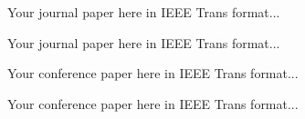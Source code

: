 

\begin{publications}
\newcommand{\JourConfTitle}[1]{\ul{\emph{#1}}}



\begin{journals}

\item Your journal paper here in IEEE Trans format...

\item Your journal paper here in IEEE Trans format...



\end{journals}


\begin{conferences}
\item Your conference paper here in IEEE Trans format...

\item Your conference paper here in IEEE Trans format...



\end{conferences}
\end{publications}
